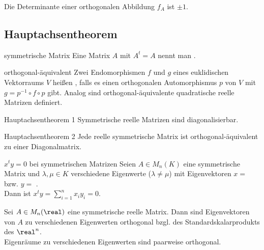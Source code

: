 \begin{Kor}
    Die Determinante einer orthogonalen Abbildung $f_A$ ist $\pm 1$.
\end{Kor}

\subsection{%
    Hauptachsentheorem%
}

\begin{Def}{symmetrische Matrix}
    Eine Matrix $A$ mit $A^t = A$ nennt man .
\end{Def}

\begin{Def}{orthogonal-äquivalent}
    Zwei Endomorphismen $f$ und $g$ eines euklidischen Vektorraums $V$
    heißen , falls es einen orthogonalen
    Automorphismus $p$ von $V$ mit $g = p^{-1} \circ f \circ p$ gibt.
    Analog sind orthogonal-äquivalente quadratische reelle Matrizen definiert.
\end{Def}

\begin{Satz}{Hauptachsentheorem 1}
    Symmetrische reelle Matrizen sind diagonalisierbar.
\end{Satz}

\begin{Satz}{Hauptachsentheorem 2}
    Jede reelle symmetrische Matrix ist orthogonal-äquivalent zu einer
    Diagonalmatrix.
\end{Satz}

\begin{Satz}{$x^t y = 0$ bei symmetrischen Matrizen}
    Seien $A \in M_n(K)$ eine symmetrische Matrix und $\lambda, \mu \in K$
    verschiedene Eigenwerte ($\lambda \not= \mu$) mit Eigenvektoren
    $x =$  bzw.
    $y =$ . \\
    Dann ist $x^t y = \sum_{i=1}^n x_i y_i = 0$.
\end{Satz}

\begin{Kor}
    Sei $A \in M_n(\real)$ eine symmetrische reelle Matrix.
    Dann sind Eigenvektoren von $A$ zu verschiedenen Eigenwerten orthogonal
    bzgl. des Standardskalarprodukts des $\real^n$. \\
    Eigenräume zu verschiedenen Eigenwerten sind paarweise orthogonal.
\end{Kor}

